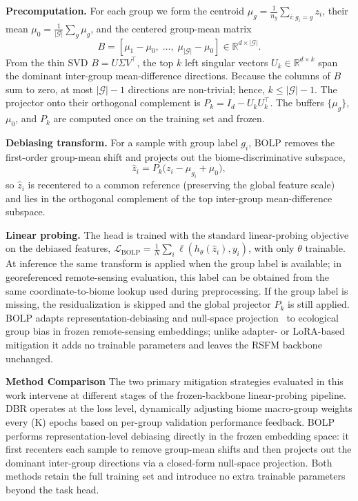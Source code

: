 \documentclass[10pt,twocolumn,letterpaper]{article}
\begin{document}
\textbf{Precomputation.} For each group we form the centroid $\mu_g=\frac{1}{n_g}\sum_{i:g_i=g}z_i$, their mean $\mu_0=\frac{1}{|\mathcal{G}|}\sum_{g}\mu_g$, and the centered group-mean matrix
\begin{equation}
B=\left[\mu_{1}-\mu_{0},\;\ldots,\;\mu_{|\mathcal{G}|}-\mu_{0}\right]\in\mathbb{R}^{d\times|\mathcal{G}|}.
\end{equation}
From the thin SVD $B=U\Sigma V^{\top}$, the top $k$ left singular vectors $U_k\in\mathbb{R}^{d\times k}$ span the dominant inter-group mean-difference directions. Because the columns of $B$ sum to zero, at most $|\mathcal{G}|-1$ directions are non-trivial; hence, $k\le|\mathcal{G}|-1$. The projector onto their orthogonal complement is $P_k=I_d-U_kU_k^{\top}$. The buffers $\{\mu_g\}$, $\mu_0$, and $P_k$ are computed once on the training set and frozen.

\textbf{Debiasing transform.} For a sample with group label $g_i$, BOLP removes the first-order group-mean shift and projects out the biome-discriminative subspace,
\begin{equation}
\hat{z}_i=P_k\big(z_i-\mu_{g_i}+\mu_0\big),
\end{equation}
so $\hat{z}_i$ is recentered to a common reference (preserving the global feature scale) and lies in the orthogonal complement of the top inter-group mean-difference subspace.

\textbf{Linear probing.} The head is trained with the standard linear-probing objective on the debiased features, $\mathcal{L}_{\mathrm{BOLP}}=\frac{1}{N}\sum_{i}\ell(h_\theta(\hat{z}_i),y_i)$, with only $\theta$ trainable. At inference the same transform is applied when the group label is available; in georeferenced remote-sensing evaluation, this label can be obtained from the same coordinate-to-biome lookup used during preprocessing. If the group label is missing, the residualization is skipped and the global projector $P_k$ is still applied. BOLP adapts representation-debiasing and null-space projection~\cite{bolukbasi2016man,ravfogel2020null} to ecological group bias in frozen remote-sensing embeddings; unlike adapter- or LoRA-based mitigation it adds no trainable parameters and leaves the RSFM backbone unchanged.

\smallskip
\noindent\textbf{Method Comparison}
The two primary mitigation strategies evaluated in this work intervene at different stages of the frozen-backbone linear-probing pipeline. DBR operates at the loss level, dynamically adjusting biome macro-group weights every (K) epochs based on per-group validation performance feedback. BOLP performs representation-level debiasing directly in the frozen embedding space: it first recenters each sample to remove group-mean shifts and then projects out the dominant inter-group directions via a closed-form null-space projection. Both methods retain the full training set and introduce no extra trainable parameters beyond the task head.
\end{document}
